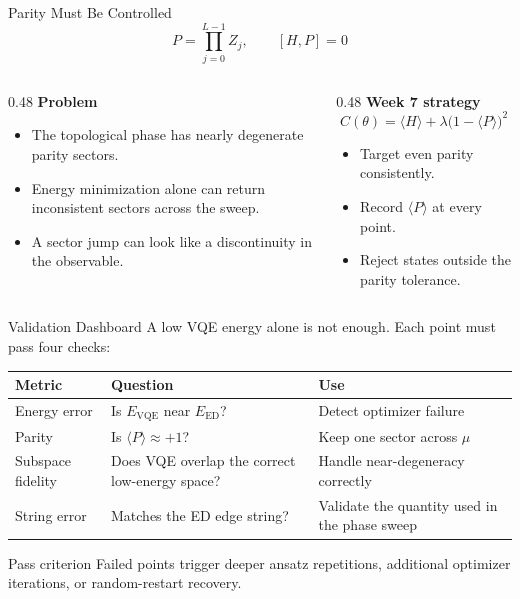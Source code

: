 \documentclass[aspectratio=169,12pt]{beamer}
\begin{document}
\begin{frame}{Parity Must Be Controlled}
  \begin{equation*}
    P=\prod_{j=0}^{L-1}Z_j,\qquad [H,P]=0
  \end{equation*}

  \begin{columns}[T]
    \begin{column}{0.48\textwidth}
      \textbf{Problem}
      \begin{itemize}
        \item The topological phase has nearly degenerate parity sectors.
        \item Energy minimization alone can return inconsistent sectors across the sweep.
        \item A sector jump can look like a discontinuity in the observable.
      \end{itemize}
    \end{column}
    \begin{column}{0.48\textwidth}
      \textbf{Week 7 strategy}
      \begin{equation*}
        C(\theta)=\langle H\rangle+\lambda\bigl(1-\langle P\rangle\bigr)^2
      \end{equation*}
      \begin{itemize}
        \item Target even parity consistently.
        \item Record $\langle P\rangle$ at every point.
        \item Reject states outside the parity tolerance.
      \end{itemize}
    \end{column}
  \end{columns}
\end{frame}

\begin{frame}{Validation Dashboard}
  \footnotesize
  A low VQE energy alone is not enough. Each point must pass four checks:

  \begin{center}
  \begin{tabular}{p{}p{}p{}}
    \textbf{Metric} & \textbf{Question} & \textbf{Use} \\
    \hline
    Energy error & Is $E_{\mathrm{VQE}}$ near $E_{\mathrm{ED}}$? & Detect optimizer failure \\
    Parity & Is $\langle P\rangle\approx+1$? & Keep one sector across $\mu$ \\
    Subspace fidelity & Does VQE overlap the correct low-energy space? & Handle near-degeneracy correctly \\
    String error & Matches the ED edge string? & Validate the quantity used in the phase sweep
  \end{tabular}
  \end{center}

  \begin{block}{Pass criterion}
    Failed points trigger deeper ansatz repetitions, additional optimizer iterations, or random-restart recovery.
  \end{block}
\end{frame}
\end{document}
